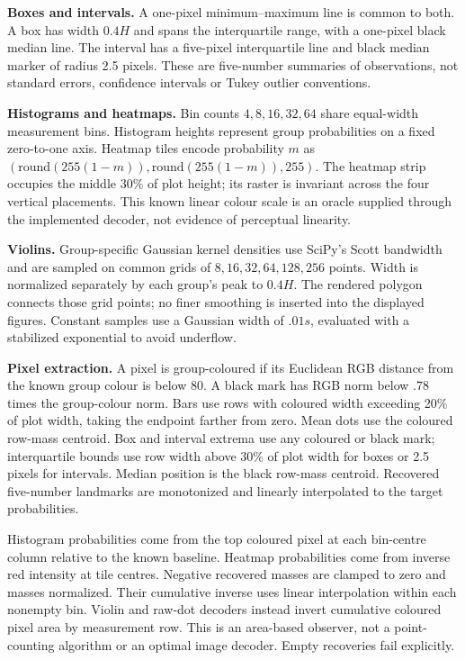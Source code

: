 \documentclass[10pt]{article}
\begin{document}
\textbf{Boxes and intervals.} A one-pixel minimum--maximum line is common to both. A box has width $0.4H$ and spans the interquartile range, with a one-pixel black median line. The interval has a five-pixel interquartile line and black median marker of radius 2.5 pixels. These are five-number summaries of observations, not standard errors, confidence intervals or Tukey outlier conventions.

\textbf{Histograms and heatmaps.} Bin counts $4,8,16,32,64$ share equal-width measurement bins. Histogram heights represent group probabilities on a fixed zero-to-one axis. Heatmap tiles encode probability $m$ as $(\mathrm{round}(255(1-m)),\mathrm{round}(255(1-m)),255)$. The heatmap strip occupies the middle 30\% of plot height; its raster is invariant across the four vertical placements. This known linear colour scale is an oracle supplied through the implemented decoder, not evidence of perceptual linearity.

\textbf{Violins.} Group-specific Gaussian kernel densities use SciPy's Scott bandwidth and are sampled on common grids of $8,16,32,64,128,256$ points. Width is normalized separately by each group's peak to $0.4H$. The rendered polygon connects those grid points; no finer smoothing is inserted into the displayed figures. Constant samples use a Gaussian width of $.01s$, evaluated with a stabilized exponential to avoid underflow.

\textbf{Pixel extraction.} A pixel is group-coloured if its Euclidean RGB distance from the known group colour is below 80. A black mark has RGB norm below $.78$ times the group-colour norm. Bars use rows with coloured width exceeding 20\% of plot width, taking the endpoint farther from zero. Mean dots use the coloured row-mass centroid. Box and interval extrema use any coloured or black mark; interquartile bounds use row width above 30\% of plot width for boxes or 2.5 pixels for intervals. Median position is the black row-mass centroid. Recovered five-number landmarks are monotonized and linearly interpolated to the target probabilities.

Histogram probabilities come from the top coloured pixel at each bin-centre column relative to the known baseline. Heatmap probabilities come from inverse red intensity at tile centres. Negative recovered masses are clamped to zero and masses normalized. Their cumulative inverse uses linear interpolation within each nonempty bin. Violin and raw-dot decoders instead invert cumulative coloured pixel area by measurement row. This is an area-based observer, not a point-counting algorithm or an optimal image decoder. Empty recoveries fail explicitly.
\end{document}
